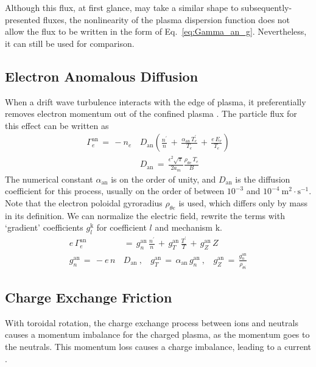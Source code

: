 Although this flux, at first glance, may take a similar shape to subsequently-presented fluxes, the nonlinearity of the plasma dispersion function does not allow the flux to be written in the form of Eq.~\ref{eq:Gamma_an_g}.
Nevertheless, it can still be used for comparison.


\subsection{Electron Anomalous Diffusion}\label{ssec:an_diffusion}
When a drift wave turbulence interacts with the edge of plasma, it preferentially removes electron momentum out of the confined plasma \cite{itoh_model_1988} \cite{stringer_non-ambipolar_1995}.
The particle flux for this effect can be written as
\begin{align} %
	\Gamma_e^\text{an} \,=\, -n_e \, &D_\text{an} \left(\frac{n^\prime}{n} \,+\,
		\frac{\alpha_\text{an}\,T_e^\prime}{T_e} \,+\, \frac{e\,E_r}{T_e}\right)
		\label{eq:Gamma_an_orig} \\
	&D_\text{an} \,=\, \frac{\epsilon^2 \sqrt{\pi}}{2 a_m}
		\frac{\rho_{\theta e} \, T_e}{B} \label{eq:D_an}
\end{align}
The numerical constant $\alpha_\text{an}$ is on the order of unity, and $D_\text{an}$ is the diffusion coefficient for this process, usually on the order of between $10^{-3}$ and $10^{-4}~\text{m}^2\cdot\text{s}^{-1}$.
Note that the electron poloidal gyroradius $\rho_{\theta e}$ is used, which differs only by mass in its definition.
We can normalize the electric field, rewrite the terms with `gradient' coefficients $g_l^\text{k}$ for coefficient $l$ and mechanism $\text{k}$.
\begin{align} %
	e\,\Gamma_e^\text{an} \,&=\, g_n^\text{an}\,\frac{n^\prime}{n} \,+\,
		g_T^\text{an}\,\frac{T^\prime}{T} \,+\,
		g_Z^\text{an}\,Z \label{eq:Gamma_an_g} \\
	g_n^\text{an} \,=\, -e \, n \, &D_\text{an}~,~~~~
		g_T^\text{an} \,=\, \alpha_\text{an} \, g_n^\text{an}~,~~~~
		g_Z^\text{an} \,=\, \frac{g_n^\text{an}}{\rho_{\theta i}}
		\label{eq:g_an}
\end{align}


\subsection{Charge Exchange Friction}\label{ssec:cx_friction}
With toroidal rotation, the charge exchange process between ions and neutrals causes a momentum imbalance for the charged plasma, as the momentum goes to the neutrals.
This momentum loss causes a charge imbalance, leading to a current \cite{toda_theoretical_1997}.

